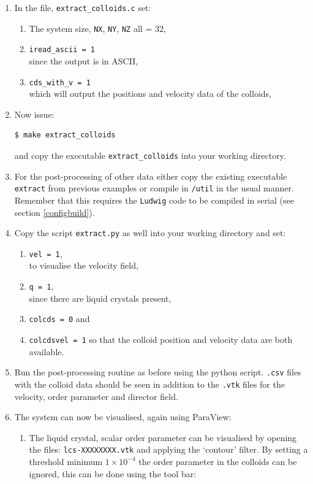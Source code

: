 \documentclass[11pt,twoside,a4paper]{article}
\begin{document}
\begin{enumerate}
\item In the file, \texttt{extract\_colloids.c} set:
\begin{enumerate}
\item The system size, \texttt{NX},  \texttt{NY},  \texttt{NZ} all = 32,
\item \texttt{iread\_ascii = 1} \\ since the output is in ASCII,
\item \texttt{cds\_with\_v  = 1} \\ which will output the positions and velocity data of the colloids,
\end{enumerate}
\item Now issue: \\
\begin{lstlisting}
$ make extract_colloids
\end{lstlisting}
and copy the executable \texttt{extract\_colloids} into your working directory.
\item For the post-processing of other data either copy the existing executable \texttt{extract} from 
previous examples or compile in \texttt{/util} in the usual manner.
Remember that this requires the \texttt{Ludwig} code to be compiled in serial 
(see section \ref{configbuild}).

\item Copy the script \texttt{extract.py} as well into your working directory and set:
\begin{enumerate}
\item \texttt{vel = 1}, \\ to visualise the velocity field,
\item \texttt{q = 1}, \\ since there are liquid crystals present,
\item \texttt{colcds = 0} and 
\item \texttt{colcdsvel = 1} so that the colloid position and velocity data are both available.
\end{enumerate}

\item Run the post-processing routine as before using the python script. 
\texttt{.csv} files with the colloid data should 
be seen in addition to the \texttt{.vtk} files for the velocity, order parameter and director field.
\item The system can now be visualised, again using ParaView:
\begin{enumerate}
\item The liquid crystal, scalar order parameter can be visualised by opening the files: 
\texttt{lcs-XXXXXXXX.vtk} and applying the `contour' filter. By setting a threshold 
minimum $1 \times 10^{-4}$ the order parameter in the colloids can be ignored, this can be done using the tool bar:


\end{enumerate}
\end{enumerate}
\end{document}
